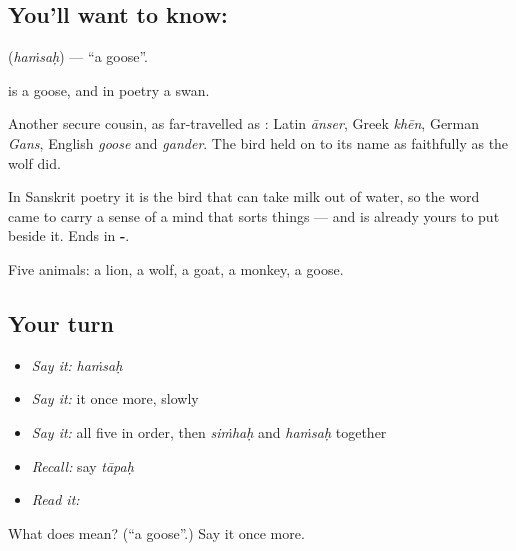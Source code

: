 \subsection*{You'll want to know: }
\textbf{} (\emph{haṁsaḥ}) — \textquotedblleft{}a goose\textquotedblright{}.

\textbf{} is a goose, and in poetry a swan.

Another secure cousin, as far-travelled as : Latin \emph{ānser}, Greek \emph{khēn}, German \emph{Gans}, English \emph{goose} and \emph{gander}. The bird held on to its name as faithfully as the wolf did.

In Sanskrit poetry it is the bird that can take milk out of water, so the word came to carry a sense of a mind that sorts things — and  is already yours to put beside it. Ends in \textbf{-}.

\begin{grammarlens}[title={What you've built}]
Five animals: a lion, a wolf, a goat, a monkey, a goose.
\end{grammarlens}

\subsection*{Your turn}
\begin{itemize}
\raggedright
  \item \emph{Say it:} \emph{haṁsaḥ}
  \item \emph{Say it:} it once more, slowly
  \item \emph{Say it:} all five in order, then \emph{siṁhaḥ} and \emph{haṁsaḥ} together
  \item \emph{Recall:} say \emph{tāpaḥ}
  \item \emph{Read it:} \textbf{}
\end{itemize}

\begin{tcolorbox}[breakable,colback=teal!4,colframe=teal!35!black,title={Before you move on}]
What does  mean? (\textquotedblleft{}a goose\textquotedblright{}.) Say it once more.
\end{tcolorbox}
